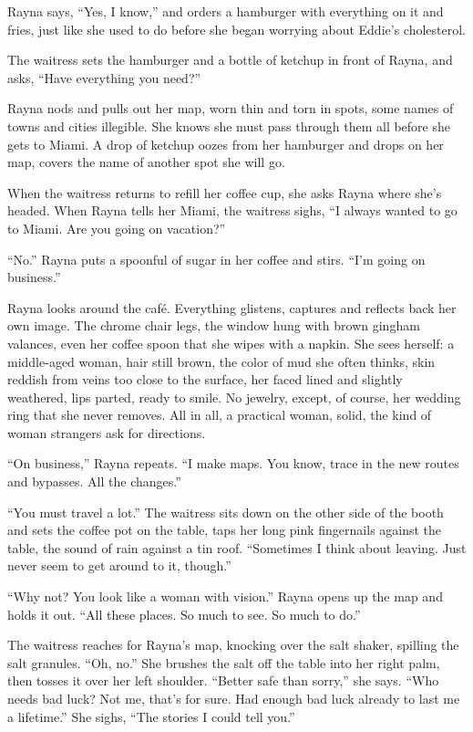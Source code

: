 \documentclass[twoside,10pt]{book}
\begin{document}
Rayna says, ``Yes, I know,'' and orders a hamburger with everything on
it and fries, just like she used to do before she began worrying about
Eddie's cholesterol.

The waitress sets the hamburger and a bottle of ketchup in front of
Rayna, and asks, ``Have everything you need?''

Rayna nods and pulls out her map, worn thin and torn in spots, some
names of towns and cit­ies illegible. She knows she must pass through
them all before she gets to Miami. A drop of ketchup oozes from her
hamburger and drops on her map, covers the name of another spot she will
go.

When the waitress returns to refill her coffee cup, she asks Rayna where
she's headed. When Rayna tells her Miami, the waitress sighs, ``I always
wanted to go to Miami. Are you going on vacation?''

``No.'' Rayna puts a spoonful of sugar in her coffee and stirs. ``I'm
going on business.''

Rayna looks around the café. Everything glistens, captures and reflects
back her own image. The chrome chair legs, the window hung with brown
gingham valances, even her coffee spoon that she wipes with a napkin.
She sees herself: a middle-aged woman, hair still brown, the color of
mud she often thinks, skin reddish from veins too close to the surface,
her faced lined and slightly weathered, lips parted, ready to smile. No
jewelry, except, of course, her wedding ring that she never removes. All
in all, a practical woman, solid, the kind of woman strangers ask for
directions.

``On business,'' Rayna repeats. ``I make maps. You know, trace in the
new routes and bypasses. All the changes.''

``You must travel a lot.'' The waitress sits down on the other side of
the booth and sets the cof­fee pot on the table, taps her long pink
fingernails against the table, the sound of rain against a tin roof.
``Sometimes I think about leaving. Just never seem to get around to it,
though.''

``Why not? You look like a woman with vision.'' Rayna opens up the map
and holds it out. ``All these places. So much to see. So much to do.''

The waitress reaches for Rayna's map, knocking over the salt shaker,
spilling the salt granules. ``Oh, no.'' She brushes the salt off the
table into her right palm, then tosses it over her left shoulder.
``Better safe than sorry,'' she says. ``Who needs bad luck? Not me,
that's for sure. Had enough bad luck already to last me a lifetime.''
She sighs, ``The stories I could tell you.''
\end{document}

